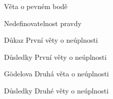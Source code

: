 \documentclass{beamer}
\begin{document}
\begin{frame}{Věta o pevném bodě}
    

\end{frame}


\begin{frame}{Nedefinovatelnost pravdy}

    
\end{frame}


\begin{frame}{Důkaz První věty o neúplnosti}

    
\end{frame}


\begin{frame}{Důsledky První věty o neúplnosti}
    

\end{frame}


\begin{frame}{Gödelova Druhá věta o neúplnosti}
    

\end{frame}


\begin{frame}{Důsledky Druhé věty o neúplnosti}

    
\end{frame}
\end{document}
